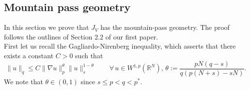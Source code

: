 \documentclass[11pt,reqno]{amsart}
\theoremstyle{definition}
\numberwithin{equation}{section}
\numberwithin{theorem}{section}
\numberwithin{equation}{section}
\numberwithin{theorem}{section}
\newcommand{\R}{\mathbb{R}}
\begin{document}
\subsection{Mountain pass geometry}
In this section we prove that $J_V$ has the mountain-pass geometry. The proof follows the outlines of Section $2.2$ of our first paper.\\

First let us recall the Gagliardo-Nirenberg inequality, which asserts that there exists a constant $C>0$ such that
\begin{equation}
\|u\|_q\le C\|\nabla u\|_p^\theta \|u\|_s^{1-\theta}   \qquad\forall\, u\in W^{1,p}(\R^N),\,\theta:=\frac{pN(q-s)}{q(p(N+s)-sN)}.
\end{equation}
We note that $\theta\in(0,1)$ since $s\le p<q<p^*$. \\
\end{document}
